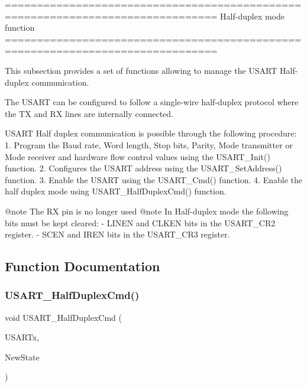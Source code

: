 \begin{DoxyVerb} ===============================================================================
                         Half-duplex mode function
 ===============================================================================  

  This subsection provides a set of functions allowing to manage the USART 
  Half-duplex communication.
  
  The USART can be configured to follow a single-wire half-duplex protocol where 
  the TX and RX lines are internally connected.

  USART Half duplex communication is possible through the following procedure:
     1. Program the Baud rate, Word length, Stop bits, Parity, Mode transmitter 
        or Mode receiver and hardware flow control values using the USART_Init()
        function.
     2. Configures the USART address using the USART_SetAddress() function.
     3. Enable the USART using the USART_Cmd() function.
     4. Enable the half duplex mode using USART_HalfDuplexCmd() function.


@note The RX pin is no longer used
@note In Half-duplex mode the following bits must be kept cleared:
        - LINEN and CLKEN bits in the USART_CR2 register.
        - SCEN and IREN bits in the USART_CR3 register.\end{DoxyVerb}
 

\subsection{Function Documentation}
\mbox{\label{group___u_s_a_r_t___group5_gaaa23b05fe0e1896bad90da7f82750831}} 
\subsubsection{\texorpdfstring{U\+S\+A\+R\+T\+\_\+\+Half\+Duplex\+Cmd()}{USART\_HalfDuplexCmd()}}
{\footnotesize\ttfamily void U\+S\+A\+R\+T\+\_\+\+Half\+Duplex\+Cmd (\begin{DoxyParamCaption}\item[{\hyperlink{struct_u_s_a_r_t___type_def}{U\+S\+A\+R\+T\+\_\+\+Type\+Def} $\ast$}]{U\+S\+A\+R\+Tx,  }\item[{Functional\+State}]{New\+State }\end{DoxyParamCaption})}



